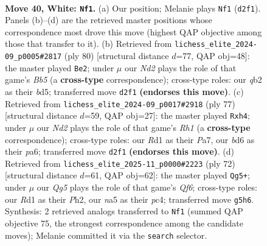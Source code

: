 \documentclass[11pt]{article}
\begin{document}
\clearpage

\begin{figure}[p]\centering
\begin{subfigure}{0.46\textwidth}\centering
\resizebox{\linewidth}{!}{%
\newchessgame
\chessboard[
  setfen={r5r1/p5pp/2kb4/n2p2QP/p2P2P1/4P2K/1q1N4/3R4 w - - 1 40},
  showmover=false,
  pgfstyle=straightmove, color=movearrow, markmove={d2-f1}
]}
\caption{}
\end{subfigure}\hfill
\begin{subfigure}{0.46\textwidth}\centering
\resizebox{\linewidth}{!}{%
\newchessgame
\chessboard[
  setfen={1q5k/5r1p/5p1Q/1B1b1p2/5P2/1P2p3/1KP4P/4R3 w - - 3 41},
  showmover=false,
  pgfstyle=straightmove, color=movearrow, markmove={b5-e2}
]}
\caption{}
\end{subfigure}
\\[4pt]
\begin{subfigure}{0.46\textwidth}\centering
\resizebox{\linewidth}{!}{%
\newchessgame
\chessboard[
  setfen={k6r/p7/Ppp1p3/3n4/2RPq1pP/1Q6/1P3P2/2R3K1 b - - 0 39},
  showmover=false,
  pgfstyle=straightmove, color=movearrow, markmove={h8-h4}
]}
\caption{}
\end{subfigure}\hfill
\begin{subfigure}{0.46\textwidth}\centering
\resizebox{\linewidth}{!}{%
\newchessgame
\chessboard[
  setfen={2b2rk1/p4p1p/5Q2/q1N1p3/2p5/P5P1/5P1P/6K1 w - - 8 37},
  showmover=false,
  pgfstyle=straightmove, color=movearrow, markmove={f6-g5}
]}
\caption{}
\end{subfigure}
\caption{\textbf{Move 40, White: \texttt{Nf1}.} (a) Our position; Melanie plays \texttt{Nf1} (\texttt{d2f1}). Panels (b)--(d) are the retrieved master positions whose correspondence most drove this move (highest QAP objective among those that transfer to it). (b) Retrieved from \texttt{lichess\_elite\_2024-09\_p0005\#2817} (ply 80) [structural distance $d$=77, QAP obj=48]: the master played \texttt{Be2}; under $\mu$ our \emph{Nd2} plays the role of that game's \emph{Bb5} (a \textbf{cross-type} correspondence); cross-type roles: our \emph{q}b2 as their \emph{b}d5; transferred move \texttt{d2f1} \textbf{(endorses this move)}. (c) Retrieved from \texttt{lichess\_elite\_2024-09\_p0017\#2918} (ply 77) [structural distance $d$=59, QAP obj=27]: the master played \texttt{Rxh4}; under $\mu$ our \emph{Nd2} plays the role of that game's \emph{Rh1} (a \textbf{cross-type} correspondence); cross-type roles: our \emph{R}d1 as their \emph{P}a7, our \emph{b}d6 as their \emph{p}a6; transferred move \texttt{d2f1} \textbf{(endorses this move)}. (d) Retrieved from \texttt{lichess\_elite\_2025-11\_p0000\#2223} (ply 72) [structural distance $d$=61, QAP obj=62]: the master played \texttt{Qg5+}; under $\mu$ our \emph{Qg5} plays the role of that game's \emph{Qf6}; cross-type roles: our \emph{R}d1 as their \emph{P}h2, our \emph{n}a5 as their \emph{p}c4; transferred move \texttt{g5h6}. Synthesis: 2 retrieved analogs transferred to \texttt{Nf1} (summed QAP objective 75, the strongest correspondence among the candidate moves); Melanie committed it via the \texttt{search} selector.}
\label{fig:thought-m78}
\end{figure}
\end{document}
